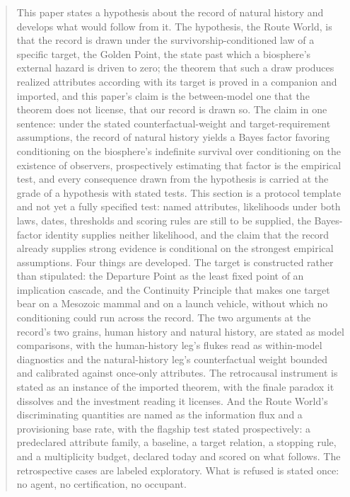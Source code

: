 \begin{abstract}
This paper states a hypothesis about the record of natural history and
develops what would follow from it. The hypothesis, the Route World, is
that the record is drawn under the survivorship-conditioned law of a
specific target, the Golden Point, the state past which a biosphere's
external hazard is driven to zero; the theorem that such a draw produces
realized attributes according with its target is proved in a companion
and imported, and this paper's claim is the between-model one that the
theorem does not license, that our record is drawn so. The claim in one
sentence: under the stated counterfactual-weight and target-requirement
assumptions, the record of natural history yields a Bayes factor
favoring conditioning on the biosphere's indefinite survival over
conditioning on the existence of observers, prospectively estimating
that factor is the empirical test, and every consequence drawn from the
hypothesis is carried at the grade of a hypothesis with stated tests. This section is a protocol template and not yet a fully specified test: named attributes, likelihoods under both laws, dates, thresholds and scoring rules are still to be supplied, the Bayes-factor identity supplies neither likelihood, and the claim that the record already supplies strong evidence is conditional on the strongest empirical assumptions. Four things are developed.
The target is constructed rather than stipulated: the Departure Point as
the least fixed point of an implication cascade, and the Continuity
Principle that makes one target bear on a Mesozoic mammal and on a launch
vehicle, without which no conditioning could run across the record. The
two arguments at the record's two grains, human history and natural
history, are stated as model comparisons, with the human-history leg's
flukes read as within-model diagnostics and the natural-history leg's
counterfactual weight bounded and calibrated against once-only
attributes. The retrocausal instrument is stated as an instance of the
imported theorem, with the finale paradox it dissolves and the investment
reading it licenses. And the Route World's discriminating quantities are
named as the information flux and a provisioning base rate, with the
flagship test stated prospectively: a predeclared attribute family, a
baseline, a target relation, a stopping rule, and a multiplicity budget,
declared today and scored on what follows. The retrospective cases are
labeled exploratory. What is refused is stated once: no agent, no
certification, no occupant.
\end{abstract}


